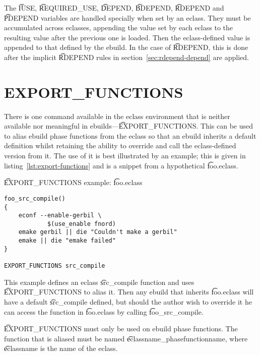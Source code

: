 The \t{IUSE}, \t{REQUIRED_USE}, \t{DEPEND}, \t{BDEPEND}, \t{RDEPEND} and \t{PDEPEND} variables
are handled specially when set by an eclass. They must be accumulated across eclasses, appending
the value set by each eclass to the resulting value after the previous one is loaded. Then the
eclass-defined value is appended to that defined by the ebuild. In the case of \t{RDEPEND}, this
is done after the implicit \t{RDEPEND} rules in section~\ref{sec:rdepend-depend} are applied.

\section{EXPORT_FUNCTIONS}

There is one command available in the eclass environment that is neither available nor meaningful
in ebuilds---\t{EXPORT_FUNCTIONS}\@. This can be used to alias ebuild phase functions from the
eclass so that an ebuild inherits a default definition whilst retaining the ability to override and
call the eclass-defined version from it. The use of it is best illustrated by an example; this is
given in listing~\ref{lst:export-functions} and is a snippet from a hypothetical \t{foo.eclass}.

\begin{listing}
\caption{\t{EXPORT_FUNCTIONS} example: \t{foo.eclass}} \label{lst:export-functions}
\begin{verbatim}
foo_src_compile()
{
    econf --enable-gerbil \
            $(use_enable fnord)
    emake gerbil || die "Couldn't make a gerbil"
    emake || die "emake failed"
}

EXPORT_FUNCTIONS src_compile
\end{verbatim}
\end{listing}

This example defines an eclass \t{src_compile} function and uses \t{EXPORT_FUNCTIONS} to alias
it. Then any ebuild that inherits \t{foo.eclass} will have a default \t{src_compile} defined, but
should the author wish to override it he can access the function in \t{foo.eclass} by calling
\t{foo_src_compile}.

\t{EXPORT_FUNCTIONS} must only be used on ebuild phase functions. The function that is aliased
must be named \t{eclassname_phasefunctionname}, where \t{eclassname} is the name of the eclass.


